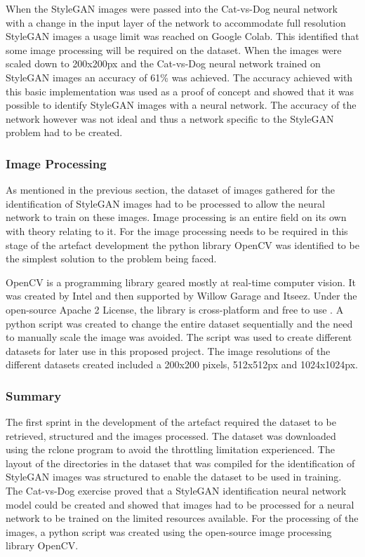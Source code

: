 When the StyleGAN images were passed into the Cat-vs-Dog neural network with a change in the input layer of the network to accommodate full resolution StyleGAN images a usage limit was reached on Google Colab. This identified that some image processing will be required on the dataset. When the images were scaled down to 200x200px and the Cat-vs-Dog neural network trained on StyleGAN images an accuracy of 61\% was achieved. The accuracy achieved with this basic implementation was used as a proof of concept and showed that it was possible to identify StyleGAN images with a neural network. The accuracy of the network however was not ideal and thus a network specific to the StyleGAN problem had to be created.

\subsubsection{Image Processing}

As mentioned in the previous section, the dataset of images gathered for the identification of StyleGAN images had to be processed to allow the neural network to train on these images. Image processing is an entire field on its own with theory relating to it. For the image processing needs to be required in this stage of the artefact development the python library OpenCV was identified to be the simplest solution to the problem being faced. 

OpenCV is a programming library geared mostly at real-time computer vision. It was created by Intel and then supported by Willow Garage and Itseez. Under the open-source Apache 2 License, the library is cross-platform and free to use \citep{opencv2012}. A python script was created to change the entire dataset sequentially and the need to manually scale the image was avoided. The script was used to create different datasets for later use in this proposed project. The image resolutions of the different datasets created included a 200x200 pixels, 512x512px and 1024x1024px.

\subsubsection{Summary}

The first sprint in the development of the artefact required the dataset to be retrieved, structured and the images processed. The dataset was downloaded using the rclone program to avoid the throttling limitation experienced. The layout of the directories in the dataset that was compiled for the identification of StyleGAN images was structured to enable the dataset to be used in training. The Cat-vs-Dog exercise proved that a StyleGAN identification neural network model could be created and showed that images had to be processed for a neural network to be trained on the limited resources available. For the processing of the images, a python script was created using the open-source image processing library OpenCV.

